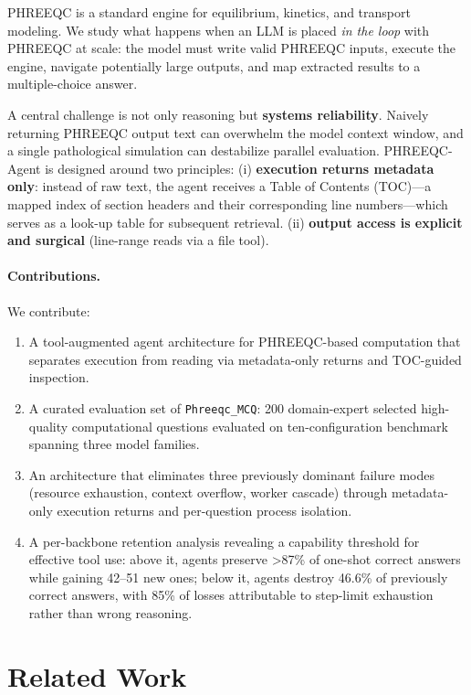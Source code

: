 \documentclass[sigconf,anonymous]{acmart}
\begin{document}
PHREEQC is a standard engine for equilibrium, kinetics, and transport modeling. We study what happens when an LLM is placed \emph{in the loop} with PHREEQC at scale: the model must write valid PHREEQC inputs, execute the engine, navigate potentially large outputs, and map extracted results to a multiple-choice answer.

A central challenge is not only reasoning but \textbf{systems reliability}. Naively returning PHREEQC output text can overwhelm the model context window, and a single pathological simulation can destabilize parallel evaluation. PHREEQC-Agent is designed around two principles:
(i) \textbf{execution returns metadata only}: instead of raw text, the agent receives a Table of Contents (TOC)—a mapped index of section headers and their corresponding line numbers—which serves as a look-up table for subsequent retrieval.
(ii) \textbf{output access is explicit and surgical} (line-range reads via a file tool).

\paragraph{Contributions.}
We contribute:
\begin{enumerate}[leftmargin=*, itemsep=2pt]
  \item A tool-augmented agent architecture for PHREEQC-based computation that separates execution from reading via metadata-only returns and TOC-guided inspection.
  \item A curated evaluation set of \texttt{Phreeqc\_MCQ}: 200 domain-expert selected high-quality computational questions evaluated on ten-configuration benchmark spanning three model families.
  \item An architecture that eliminates three previously dominant failure modes (resource exhaustion, context overflow, worker cascade) through metadata-only execution returns and per-question process isolation.
  \item A per-backbone retention analysis revealing a capability threshold for effective tool use: above it, agents preserve {>}87\% of one-shot correct answers while gaining 42--51 new ones; below it, agents destroy 46.6\% of previously correct answers, with 85\% of losses attributable to step-limit exhaustion rather than wrong reasoning.
\end{enumerate}
\section{Related Work}
\end{document}
